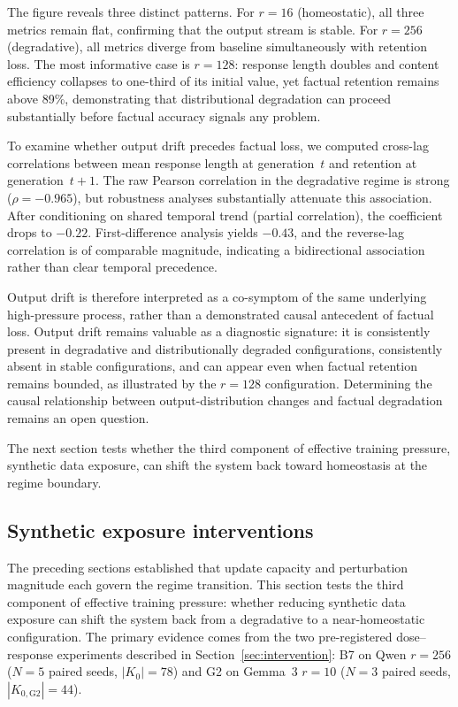 \documentclass[a4paper,fleqn]{cas-dc}
\newif\ifshowchanges
\newcommand{\rev}[1]{\ifshowchanges{\color{blue}#1}\else{#1}\fi}
\newcommand{\Kcard}{\lvert K_0\rvert}
\begin{document}
The figure reveals three distinct patterns. For $r=16$ (homeostatic), all three
metrics remain flat, confirming that the output stream is stable. For $r=256$
(degradative), all metrics diverge from baseline simultaneously with retention
loss. The most informative case is $r=128$: response length doubles and content
efficiency collapses to one-third of its initial value, yet factual retention
remains above 89\%, demonstrating that distributional degradation can proceed
substantially before factual accuracy signals any problem.

To examine whether output drift precedes factual loss, we computed cross-lag
correlations between mean response length at generation~$t$ and retention at
generation~$t{+}1$. The raw Pearson correlation in the degradative regime is
strong ($\rho = -0.965$), but robustness analyses substantially attenuate this
association. After conditioning on shared temporal trend (partial correlation),
the coefficient drops to $-0.22$. First-difference analysis yields $-0.43$, and
the reverse-lag correlation is of comparable magnitude, indicating a
bidirectional association rather than clear temporal precedence.

Output drift is therefore interpreted as a co-symptom of the same underlying
high-pressure process, rather than a demonstrated causal antecedent of factual
loss. Output drift remains valuable as a diagnostic signature: it is
consistently present in degradative and distributionally degraded configurations,
consistently absent in stable configurations, and can appear even when factual
retention remains bounded, as illustrated by the $r=128$ configuration.
Determining the causal relationship between output-distribution changes and
factual degradation remains an open question.

The next section tests whether the third component of effective training
pressure, synthetic data exposure, can shift the system back toward homeostasis
at the regime boundary.

\subsection{Synthetic exposure interventions}\label{sec:res_intervention}

The preceding sections established that update capacity and perturbation
magnitude each govern the regime transition. This section tests the third
component of effective training pressure: whether reducing synthetic data
exposure can shift the system back from a degradative to a near-homeostatic
configuration. The primary evidence comes from the two pre-registered
dose--response experiments described in Section~\ref{sec:intervention}:
B7 on Qwen $r=256$ (\rev{$N=5$} paired seeds, $\Kcard=78$) and G2 on Gemma~3 $r=10$
(\rev{$N=3$} paired seeds, $|K_{0,\mathrm{G2}}|=44$).
\end{document}
